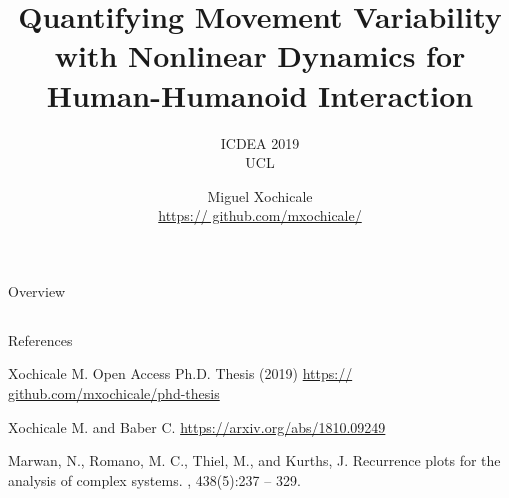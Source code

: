 \documentclass[compress]{beamer}
\title{
Quantifying Movement Variability \\ 
with Nonlinear Dynamics for \\ 
Human-Humanoid Interaction
}
\subtitle{
ICDEA 2019 \\
UCL 
}
\date{}
\author{
{\footnotesize Miguel Xochicale} \\ 
{\scriptsize \url{https:// github.com/mxochicale/}  }
}
\begin{document}

\maketitle

\begin{frame}{Overview}
\tableofcontents
\end{frame}










\subsection{}
\begin{frame}{References}
    \begin{thebibliography}{10}

\beamertemplatearticlebibitems

	Xochicale M.
	\newblock {} 
      	\newblock Open Access Ph.D. Thesis (2019) 
      	\newblock \url{https:// github.com/mxochicale/phd-thesis}

	Xochicale M. and Baber C.
	\newblock {}
	 \url{https://arxiv.org/abs/1810.09249}


	Marwan, N., Romano, M. C., Thiel, M., and Kurths, J.
	\newblock Recurrence plots for the analysis of complex systems.
	, 438(5):237 -- 329.


    \end{thebibliography}
\end{frame}






\end{document}
